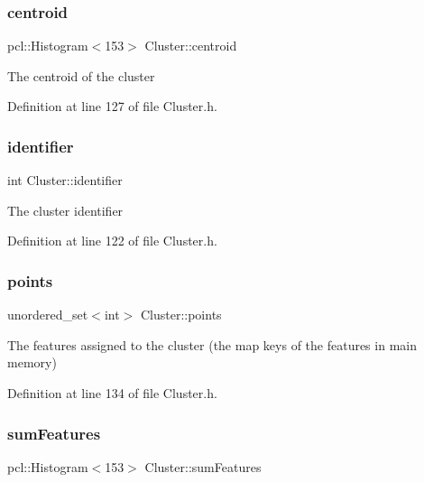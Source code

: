 \subsubsection{\texorpdfstring{centroid}{centroid}}
{\footnotesize\ttfamily pcl\+::\+Histogram$<$153$>$ Cluster\+::centroid\hspace{0.3cm}{\ttfamily [protected]}}

The centroid of the cluster 

Definition at line 127 of file Cluster.\+h.

\mbox{\label{class_cluster_a5b3de44acabe712cdcc405fa40f8812a}} 
\subsubsection{\texorpdfstring{identifier}{identifier}}
{\footnotesize\ttfamily int Cluster\+::identifier\hspace{0.3cm}{\ttfamily [protected]}}

The cluster identifier 

Definition at line 122 of file Cluster.\+h.

\mbox{\label{class_cluster_a9aa583a643474a3744e1508ab51807d5}} 
\subsubsection{\texorpdfstring{points}{points}}
{\footnotesize\ttfamily unordered\+\_\+set$<$int$>$ Cluster\+::points\hspace{0.3cm}{\ttfamily [protected]}}

The features assigned to the cluster (the map keys of the features in main memory) 

Definition at line 134 of file Cluster.\+h.

\mbox{\label{class_cluster_a9440083a17c6144a556433afa719e8ad}} 
\subsubsection{\texorpdfstring{sum\+Features}{sumFeatures}}
{\footnotesize\ttfamily pcl\+::\+Histogram$<$153$>$ Cluster\+::sum\+Features\hspace{0.3cm}{\ttfamily [protected]}}

